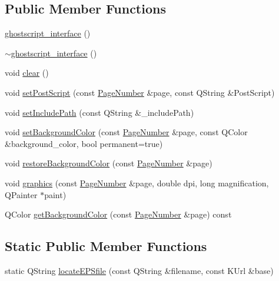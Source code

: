 \subsection*{Public Member Functions}
\begin{DoxyCompactItemize}
\item 
\hyperlink{classghostscript__interface_a3bf3c8eee9c17fd5e01c98903b94640f}{ghostscript\+\_\+interface} ()
\item 
\hyperlink{classghostscript__interface_a1dbba27a394dfbb03b2584b55909dd0d}{$\sim$ghostscript\+\_\+interface} ()
\item 
void \hyperlink{classghostscript__interface_ad304fbc79f41cc832e8fe4c01751fb46}{clear} ()
\item 
void \hyperlink{classghostscript__interface_a5ae4823881dcb0f283d2ec705df38313}{set\+Post\+Script} (const \hyperlink{classPageNumber}{Page\+Number} \&page, const Q\+String \&Post\+Script)
\item 
void \hyperlink{classghostscript__interface_a493c8915bc644ffa3abeb34e8bc79d65}{set\+Include\+Path} (const Q\+String \&\+\_\+include\+Path)
\item 
void \hyperlink{classghostscript__interface_a567c1800359854b7a1b7cf24fcaea80f}{set\+Background\+Color} (const \hyperlink{classPageNumber}{Page\+Number} \&page, const Q\+Color \&background\+\_\+color, bool permanent=true)
\item 
void \hyperlink{classghostscript__interface_a4d9303488fdbbcb7519b68d6146c5a77}{restore\+Background\+Color} (const \hyperlink{classPageNumber}{Page\+Number} \&page)
\item 
void \hyperlink{classghostscript__interface_ae271c8afd873b5d6a77a67eddc12540a}{graphics} (const \hyperlink{classPageNumber}{Page\+Number} \&page, double dpi, long magnification, Q\+Painter $\ast$paint)
\item 
Q\+Color \hyperlink{classghostscript__interface_aa43188e3c387cb97e584a364bc7b3b6a}{get\+Background\+Color} (const \hyperlink{classPageNumber}{Page\+Number} \&page) const 
\end{DoxyCompactItemize}
\subsection*{Static Public Member Functions}
\begin{DoxyCompactItemize}
\item 
static Q\+String \hyperlink{classghostscript__interface_ac8e4316169f38cf76721481781415913}{locate\+E\+P\+Sfile} (const Q\+String \&filename, const K\+Url \&base)
\end{DoxyCompactItemize}
